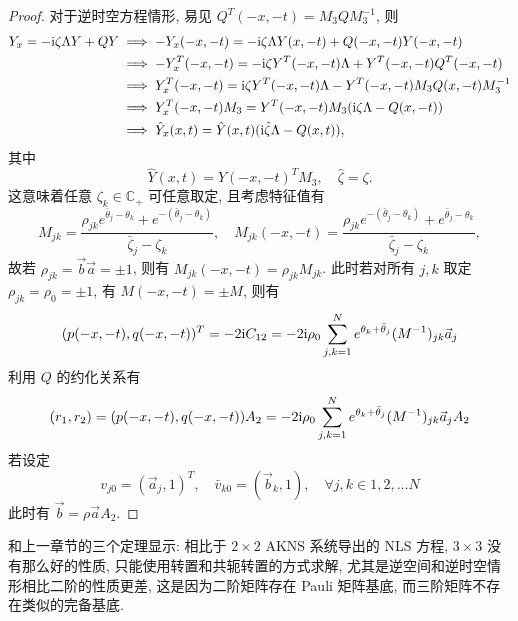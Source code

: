 \begin{proof}
    对于逆时空方程情形, 易见 $ Q^{T}(-x,-t) = M_{3} Q M_{3}^{-1} $, 则
    \begin{equation}
        \begin{aligned}
            Y_{x} = - \mathrm{i} \zeta \Lambda Y + Q Y & \implies -Y_{x}(-x,-t) = - \mathrm{i} \zeta \Lambda Y(x,-t) + Q(-x,-t) Y(-x,-t)                           \\
                                                 & \implies -Y_{x}^{T}(-x,-t) = -\mathrm{i} \zeta Y^{T}(-x,-t) \Lambda + Y^{T}(-x,-t) Q^{T}(-x,-t)           \\
                                                 & \implies Y_{x}^{T}(-x,-t) = \mathrm{i} \zeta Y^{T}(-x,-t) \Lambda - Y^{T}(-x,-t) M_{3} Q(x,-t) M_{3}^{-1} \\
                                                 & \implies Y_{x}^{T}(-x,-t) M_{3} =  Y^{T}(-x,-t)M_{3} (\mathrm{i} \zeta \Lambda - Q(x,-t))                 \\
                                                 & \implies \hat{Y}_{x}(x,t) = \hat{Y}(x,t) (\mathrm{i} \hat{\zeta} \Lambda - Q(x,t)),
        \end{aligned}
    \end{equation}
    其中
    \begin{equation}
        \hat{Y}(x,t) = Y(-x,-t)^{T} M_{3}, \quad \hat{\zeta} = \zeta.
    \end{equation}
    这意味着任意 $ \zeta_{k} \in \mathbb{C}_{+} $ 可任意取定, 且考虑特征值有
    \begin{equation}
        M_{jk} = \frac{\rho_{jk} e^{\bar{\theta}_{j} - \theta_{k}} + e^{-(\bar{\theta}_{j} - \theta_{k})}}{\bar{\zeta}_{j} - \zeta_{k}}, \quad
        M_{jk}(-x,-t) = \frac{\rho_{jk} e^{-(\bar{\theta}_{j} - \theta_{k})} + e^{\bar{\theta}_{j} - \theta_{k}}}{\bar{\zeta}_{j} - \zeta_{k}},
    \end{equation}
    故若 $\rho_{jk} = \vec{b} \vec{a} = \pm 1$, 则有 $M_{jk}(-x,-t) = \rho_{jk} M_{jk}$. 此时若对所有 $j, k$ 取定 $\rho_{jk} = \rho_{0} = \pm 1$, 有 $M(-x,-t) = \pm M$, 则有
    \begin{equation}
        (p(-x,-t), q(-x,-t))^{T} = -2 \mathrm{i} C_{12} = - 2 \mathrm{i} \rho_{0} \sum_{j,k=1}^{N} e^{\theta_{k} + \bar{\theta}_{j}} (M^{-1})_{jk} \vec{a}_{j}
    \end{equation}
    利用 $Q$ 的约化关系有
    \begin{equation}
        (r_{1}, r_{2}) = (p(-x,-t), q(-x,-t)) A_{2} = - 2 \mathrm{i} \rho_{0} \sum_{j,k=1}^{N} e^{\theta_{k} + \bar{\theta}_{j}} (M^{-1})_{jk} \vec{a}_{j} A_{2}
    \end{equation}
    若设定
    \begin{equation}
        v_{j0} = (\vec{a}_{j}, 1)^{T}, \quad \bar{v}_{k0} = (\vec{b}_{k}, 1), \quad \forall j, k \in 1, 2, \dots N
    \end{equation}
    此时有 $\vec{b} = \rho \vec{a} A_{2}$.
\end{proof}
和上一章节的三个定理显示: 相比于 $ 2 \times 2 $ AKNS 系统导出的 NLS 方程, $ 3\times 3 $ 没有那么好的性质, 只能使用转置和共轭转置的方式求解, 尤其是逆空间和逆时空情形相比二阶的性质更差, 这是因为二阶矩阵存在 Pauli 矩阵基底, 而三阶矩阵不存在类似的完备基底.

